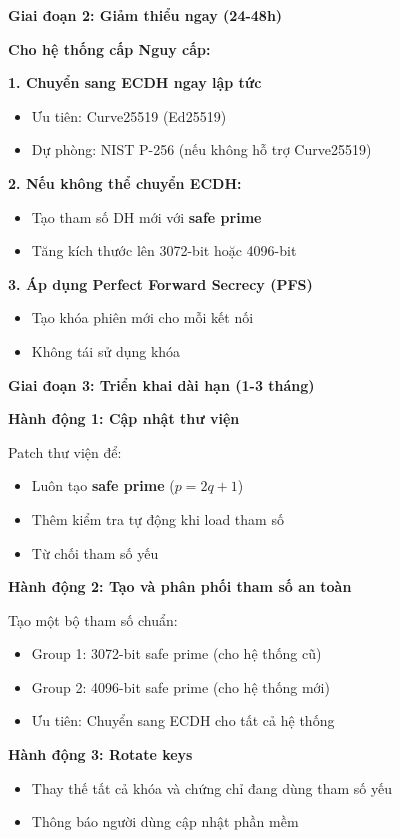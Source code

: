 \textbf{Giai đoạn 2: Giảm thiểu ngay (24-48h)}

\textbf{Cho hệ thống cấp Nguy cấp:}

\textbf{1. Chuyển sang ECDH ngay lập tức}
\begin{itemize}
    \item Ưu tiên: Curve25519 (Ed25519)
    \item Dự phòng: NIST P-256 (nếu không hỗ trợ Curve25519)
\end{itemize}

\textbf{2. Nếu không thể chuyển ECDH:}
\begin{itemize}
    \item Tạo tham số DH mới với \textbf{safe prime}
    \item Tăng kích thước lên 3072-bit hoặc 4096-bit
\end{itemize}

\textbf{3. Áp dụng Perfect Forward Secrecy (PFS)}
\begin{itemize}
    \item Tạo khóa phiên mới cho mỗi kết nối
    \item Không tái sử dụng khóa
\end{itemize}

\textbf{Giai đoạn 3: Triển khai dài hạn (1-3 tháng)}

\textbf{Hành động 1: Cập nhật thư viện}

Patch thư viện để:
\begin{itemize}
    \item Luôn tạo \textbf{safe prime} ($p = 2q + 1$)
    \item Thêm kiểm tra tự động khi load tham số
    \item Từ chối tham số yếu
\end{itemize}

\textbf{Hành động 2: Tạo và phân phối tham số an toàn}

Tạo một bộ tham số chuẩn:
\begin{itemize}
    \item Group 1: 3072-bit safe prime (cho hệ thống cũ)
    \item Group 2: 4096-bit safe prime (cho hệ thống mới)
    \item Ưu tiên: Chuyển sang ECDH cho tất cả hệ thống
\end{itemize}

\textbf{Hành động 3: Rotate keys}
\begin{itemize}
    \item Thay thế tất cả khóa và chứng chỉ đang dùng tham số yếu
    \item Thông báo người dùng cập nhật phần mềm
\end{itemize}

